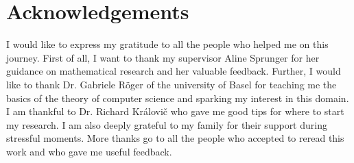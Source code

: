 \chapter*{Acknowledgements}

I would like to express my gratitude to all the people who helped me on this journey.
First of all, I want to thank my supervisor Aline Sprunger for her guidance on mathematical research and her valuable feedback.
Further, I would like to thank Dr. Gabriele Röger of the university of Basel for teaching me the basics of the theory of computer science and sparking my interest in this domain.
I am thankful to Dr. Richard Královi\v{c} who gave me good tips for where to start my research.
I am also deeply grateful to my family for their support during stressful moments.
More thanks go to all the people who accepted to reread this work and who gave me useful feedback.

